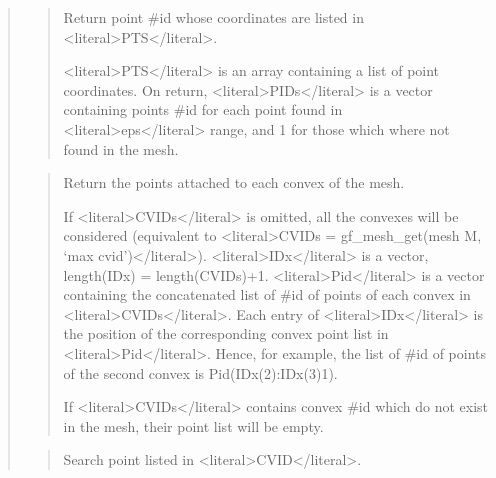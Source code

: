 \documentclass[a4paper,11pt,english]{sphinxmanual}
\begin{document}
\begin{quote}
\begin{quote}
\sphinxAtStartPar
Return point \#id whose coordinates are listed in \textless{}literal\textgreater{}PTS\textless{}/literal\textgreater{}.

\sphinxAtStartPar
\textless{}literal\textgreater{}PTS\textless{}/literal\textgreater{} is an array containing a list of point coordinates. On
return, \textless{}literal\textgreater{}PIDs\textless{}/literal\textgreater{} is a vector containing points
\#id for each point found in \textless{}literal\textgreater{}eps\textless{}/literal\textgreater{} range, and \sphinxhyphen{}1 for those
which where not found in the mesh.
\end{quote}

\sphinxAtStartPar
{}
\begin{quote}

\sphinxAtStartPar
Return the points attached to each convex of the mesh.

\sphinxAtStartPar
If \textless{}literal\textgreater{}CVIDs\textless{}/literal\textgreater{} is omitted, all the convexes will be considered
(equivalent to \textless{}literal\textgreater{}CVIDs = gf\_mesh\_get(mesh M, ‘max cvid’)\textless{}/literal\textgreater{}). \textless{}literal\textgreater{}IDx\textless{}/literal\textgreater{} is a
vector, length(IDx) = length(CVIDs)+1. \textless{}literal\textgreater{}Pid\textless{}/literal\textgreater{} is a
vector containing the concatenated list of \#id of
points of each convex in \textless{}literal\textgreater{}CVIDs\textless{}/literal\textgreater{}. Each entry of \textless{}literal\textgreater{}IDx\textless{}/literal\textgreater{} is the
position of the corresponding convex point list in \textless{}literal\textgreater{}Pid\textless{}/literal\textgreater{}. Hence,
for example, the list of \#id of points of the second convex is
Pid(IDx(2):IDx(3)\sphinxhyphen{}1).

\sphinxAtStartPar
If \textless{}literal\textgreater{}CVIDs\textless{}/literal\textgreater{} contains convex \#id which do not exist in the mesh,
their point list will be empty.
\end{quote}

\sphinxAtStartPar
{}
\begin{quote}

\sphinxAtStartPar
Search point listed in \textless{}literal\textgreater{}CVID\textless{}/literal\textgreater{}.


\end{quote}
\end{quote}
\end{document}
